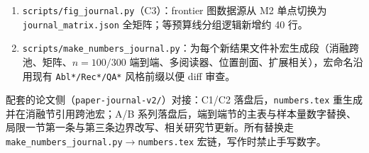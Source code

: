 \begin{enumerate}[itemsep=2pt]
\item \texttt{scripts/fig\_journal.py}（C3）：frontier 图数据源从 M2 单点切换为 \texttt{journal\_matrix.json} 全矩阵；等预算线分组逻辑新增约 40 行。

\item \texttt{scripts/make\_numbers\_journal.py}：为每个新结果文件补宏生成段（消融跨池、矩阵、$n{=}100/300$ 端到端、多阅读器、位置剖面、扩展相关），宏命名沿用现有 \texttt{Abl*/Rec*/QA*} 风格前缀以便 diff 审查。

\end{enumerate}

配套的论文侧（\texttt{paper-journal-v2/}）对接：C1/C2 落盘后，\texttt{numbers.tex} 重生成并在消融节引用跨池宏；A/B 系列落盘后，端到端节的主表与样本量数字替换、局限一节第一条与第三条边界改写、相关研究节更新。所有替换走 \texttt{make\_numbers\_journal.py}$\rightarrow$\texttt{numbers.tex} 宏链，写作时禁止手写数字。
